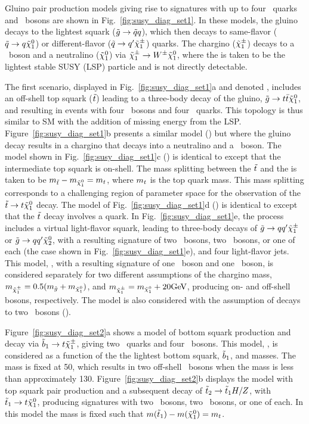 Gluino pair production models giving rise to signatures with up to four \cPqb\
quarks and \PW\ bosons are shown in Fig.~\ref{fig:susy_diag_set1}. In
these models, the gluino decays to the lightest squark ($\tilde{g} \to \tilde{q}
q$), which then decays to same-flavor ($\tilde{q} \to q \tilde{\chi}_1^0$) or
different-flavor ($\tilde{q} \to q' \tilde{\chi}_1^{\pm}$) quarks. The chargino
($\tilde{\chi}_1^{\pm}$) decays to a \PW\ boson and a neutralino ($\tilde{\chi}_1^0$) via $\tilde{\chi}_1^{\pm}
\to W^{\pm} \tilde{\chi}_1^0$, where the \lsp is taken to be the lightest stable SUSY (LSP)
particle and is not directly detectable.

The first scenario, displayed in Fig.~\ref{fig:susy_diag_set1}a and denoted
\Totttt, includes an off-shell top squark ($\tilde{t}$) leading to a
three-body decay of the gluino, $\tilde{g} \to t\bar{t}\tilde{\chi}_1^0$, and resulting in events
with four \PW\ bosons and four \cPqb\ quarks. This topology is thus similar
to SM \tttt with the addition of missing energy from the LSP.
Figure~\ref{fig:susy_diag_set1}b presents a similar model (\TfttbbWW) but where
the gluino decay results in a chargino that decays into a neutralino
and a \PW\ boson. The model shown in Fig.~\ref{fig:susy_diag_set1}c (\Tftttt)
is identical to \Totttt except that the intermediate top squark is on-shell.
The mass splitting between the $\tilde{t}$ and the \lsp is taken to be
$m_{\tilde{t}} - m_{\tilde{\chi}_1^0} = m_{t}$, where $m_{t}$ is the top quark
mass. This mass splitting corresponds to a challenging region of parameter
space for the observation of the $\tilde{t} \to t \tilde{\chi}_1^0$ decay. The model
of Fig.~\ref{fig:susy_diag_set1}d (\Tfttcc) is identical to 
\Tftttt except that the $\tilde{t}$ decay involves a \PQc quark. In
Fig.~\ref{fig:susy_diag_set1}e, the process includes a virtual
light-flavor squark, leading to three-body decays of $\tilde{g} \to q q'
\tilde{\chi}_1^{\pm}$ or $\tilde{g} \to q q' \tilde{\chi}_2^0$, with a resulting
signature of two \PW\ bosons, two \PZ\ bosons, or one of each (the case shown
in Fig.~\ref{fig:susy_diag_set1}e), and four light-flavor jets. This model,
\TfqqqqWZ, with a resulting signature of one \PW\ boson and one \PZ\ boson,
is considered separately for two different assumptions of the chargino mass,
$m_{\tilde{\chi}_1^{\pm}} = 0.5(m_{\tilde{g}} + m_{\tilde{\chi}_1^0})$, and $m_{\tilde{\chi}_1^{\pm}} =
m_{\tilde{\chi}_1^0}+20 \text{GeV}$, producing on- and off-shell bosons, respectively. The
model is also considered with the assumption of decays to two \PW\ bosons (\TfqqqqWW).

Figure~\ref{fig:susy_diag_set2}a shows a model of bottom squark production and decay
via $\tilde{b}_1 \to t \tilde{\chi}_1^{\pm}$, giving two \cPqb\
quarks and four \PW\ bosons. This model, \TsttWW, is considered as a function
of the the lightest bottom squark, $\tilde{b}_1$, and \chiplmin masses. The
\lsp mass is fixed at 50\GeV, which results in two off-shell \PW\ bosons 
when the \chiplmin mass is less than approximately
130\GeV. Figure~\ref{fig:susy_diag_set2}b displays the \TsttHZ model
with top squark pair production and a subsequent decay of
$\tilde{t}_2\to\tilde{t}_1H/Z$, with $\tilde{t}_1 \to t\tilde{\chi}_1^0$,
producing signatures with two \PH\ bosons, two \PZ\ bosons, or one of each.
In this model the \lsp mass is fixed such that
$m(\tilde{t}_1)-m(\tilde{\chi}_1^0)=m_{t}$.

